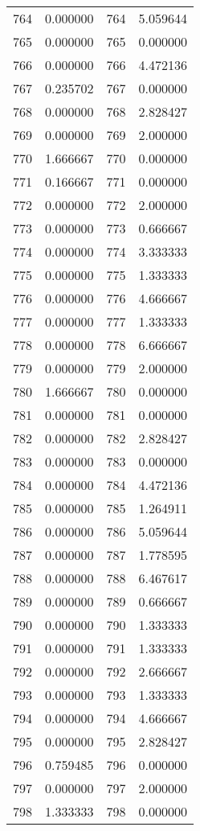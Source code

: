 \documentclass[12pt]{article}
\begin{document}
\begin{longtable}{@{}cccc@{}}
764 & 0.000000 & 764 & 5.059644 \\
765 & 0.000000 & 765 & 0.000000 \\
766 & 0.000000 & 766 & 4.472136 \\
767 & 0.235702 & 767 & 0.000000 \\
768 & 0.000000 & 768 & 2.828427 \\
769 & 0.000000 & 769 & 2.000000 \\
770 & 1.666667 & 770 & 0.000000 \\
771 & 0.166667 & 771 & 0.000000 \\
772 & 0.000000 & 772 & 2.000000 \\
773 & 0.000000 & 773 & 0.666667 \\
774 & 0.000000 & 774 & 3.333333 \\
775 & 0.000000 & 775 & 1.333333 \\
776 & 0.000000 & 776 & 4.666667 \\
777 & 0.000000 & 777 & 1.333333 \\
778 & 0.000000 & 778 & 6.666667 \\
779 & 0.000000 & 779 & 2.000000 \\
780 & 1.666667 & 780 & 0.000000 \\
781 & 0.000000 & 781 & 0.000000 \\
782 & 0.000000 & 782 & 2.828427 \\
783 & 0.000000 & 783 & 0.000000 \\
784 & 0.000000 & 784 & 4.472136 \\
785 & 0.000000 & 785 & 1.264911 \\
786 & 0.000000 & 786 & 5.059644 \\
787 & 0.000000 & 787 & 1.778595 \\
788 & 0.000000 & 788 & 6.467617 \\
789 & 0.000000 & 789 & 0.666667 \\
790 & 0.000000 & 790 & 1.333333 \\
791 & 0.000000 & 791 & 1.333333 \\
792 & 0.000000 & 792 & 2.666667 \\
793 & 0.000000 & 793 & 1.333333 \\
794 & 0.000000 & 794 & 4.666667 \\
795 & 0.000000 & 795 & 2.828427 \\
796 & 0.759485 & 796 & 0.000000 \\
797 & 0.000000 & 797 & 2.000000 \\
798 & 1.333333 & 798 & 0.000000 \\

\end{longtable}
\end{document}
